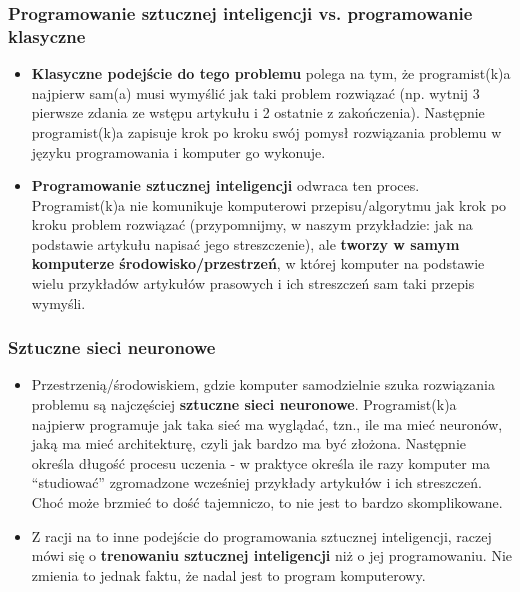 \documentclass{beamer}
\begin{document}
\begin{frame}[fragile]
\frametitle{Programowanie sztucznej inteligencji vs. programowanie klasyczne}
\begin{itemize}
\item \textbf{Klasyczne podejście do tego problemu} polega na tym, że programist(k)a najpierw sam(a) musi wymyślić jak taki problem rozwiązać (np. wytnij 3 pierwsze zdania ze wstępu artykułu i 2 ostatnie z zakończenia). Następnie programist(k)a zapisuje krok po kroku swój pomysł rozwiązania problemu w języku programowania i komputer go wykonuje.
\item \textbf{Programowanie sztucznej inteligencji} odwraca ten proces. Programist(k)a nie komunikuje komputerowi przepisu/algorytmu jak krok po kroku problem rozwiązać (przypomnijmy, w naszym przykładzie: jak na podstawie artykułu napisać jego streszczenie), ale \textbf{tworzy w samym komputerze środowisko/przestrzeń}, w której komputer na podstawie wielu przykładów artykułów prasowych i ich streszczeń sam taki przepis wymyśli. 
\end{itemize}
\end{frame}

\begin{frame}[fragile]
\frametitle{Sztuczne sieci neuronowe}
\begin{itemize}
\item Przestrzenią/środowiskiem, gdzie komputer samodzielnie szuka rozwiązania problemu są najczęściej \textbf{sztuczne sieci neuronowe}. Programist(k)a najpierw programuje jak taka sieć ma wyglądać, tzn., ile ma mieć neuronów, jaką ma mieć architekturę, czyli jak bardzo ma być złożona. Następnie określa długość procesu uczenia - w praktyce określa ile razy komputer ma “studiować” zgromadzone wcześniej przykłady artykułów i ich streszczeń. Choć może brzmieć to dość tajemniczo, to nie jest to bardzo skomplikowane.
\item Z racji na to inne podejście do programowania sztucznej inteligencji, raczej mówi się o \textbf{trenowaniu sztucznej inteligencji} niż o jej programowaniu. Nie zmienia to jednak faktu, że nadal jest to program komputerowy. 
\end{itemize}
\end{frame}
\end{document}
